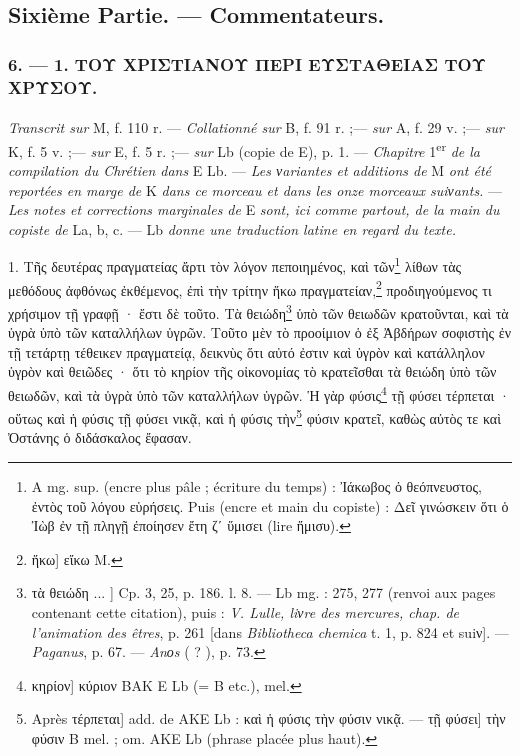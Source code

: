 \documentclass[a4paper, 11pt, oneside, polutonikogreek, french]{article}
\begin{document}
\bigskip
\centerline{\EightStarTaper}
\centerline{\EightStarTaper\EightStarTaper}
\bigskip
\clearpage
\subsection{Sixième Partie. --- Commentateurs.}
\subsubsection{6. --- 1. ΤΟΥ ΧΡΙΣΤΙΑΝΟΥ ΠΕΡΙ ΕΥΣΤΑΘΕΙΑΣ ΤΟΥ ΧΡΥΣΟΥ.}
\paragraph{}
\emph{Transcrit sur} M, f. 110 r. --- \emph{Collationné sur} B, f. 91 r. ;--- \emph{sur} A, f. 29 v. ;--- \emph{sur} K, f. 5 v. ;--- \emph{sur} E, f. 5 r. ;--- \emph{sur} Lb (copie de E), p. 1. --- \emph{Chapitre} 1\textsuperscript{er} \emph{de la compilation du Chrétien dans} E Lb. --- \emph{Les νariantes et additions de} M \emph{ont été reportées en marge de} K \emph{dans ce morceau et dans les onze morceaux suiνants.} --- \emph{Les notes et corrections marginales de} E \emph{sont, ici comme partout, de la main du copiste de} La, b, c. --- Lb \emph{donne une traduction latine en regard du texte.}

\bigskip

1. Τῆς δευτέρας πραγματείας ἄρτι τὸν λόγον πεποιημένος, καὶ τῶν\footnote{A mg. sup. (encre plus pâle ; écriture du temps) : Ἰάκωβος ὁ θεόπνευστος, ἐντὸς τοῦ λόγου εὑρήσεις. Puis (encre et main du copiste) : Δεῖ γινώσκειν ὅτι ὁ Ἰὼβ ἐν τῇ πληγῇ ἐποίησεν ἔτη ζʹ ὕμισει (lire ἥμισυ).} λίθων τὰς μεθόδους ἀφθόνως ἐκθέμενος, ἐπὶ τὴν τρίτην ἥκω πραγματείαν,\footnote{ἥκω] εἴκω M.} προδιηγούμενος τι χρήσιμον τῇ γραφῇ · ἔστι δὲ τοῦτο. Τὰ θειώδη\footnote{τὰ θειώδη ... ] Cp. 3, 25, p. 186. l. 8. --- Lb mg. : 275, 277 (renvoi aux pages contenant cette citation), puis : \emph{V. Lulle, liνre des mercures, chap. de l'animation des êtres}, p. 261 [dans \emph{Bibliotheca chemica} t. 1, p. 824 et suiν]. --- \emph{Paganus}, p. 67. --- \emph{Anοs} ( ? ), p. 73.} ὑπὸ τῶν θειωδῶν κρατοῦνται, καὶ τὰ ὑγρὰ ὑπὸ τῶν καταλλήλων ὑγρῶν. Τοῦτο μὲν τὸ προοίμιον ὁ ἐξ Ἀβδήρων σοφιστὴς ἐν τῇ τετάρτῃ τέθεικεν πραγματείᾳ, δεικνὺς ὅτι αὐτό ἐστιν καὶ ὑγρὸν καὶ κατάλληλον ὑγρὸν καὶ θειῶδες · ὅτι τὸ κηρίον τῆς οἰκονομίας τὸ κρατεῖσθαι τὰ θειώδη ὑπὸ τῶν θειωδῶν, καὶ τὰ ὑγρὰ ὑπὸ τῶν καταλλήλων ὑγρῶν. Ἡ γὰρ φύσις\footnote{κηρίον] κύριον BAK E Lb (= B etc.), mel.} τῇ φύσει τέρπεται · οὕτως καὶ ἡ φύσις τῇ φύσει νικᾷ, καὶ ἡ φύσις τὴν\footnote{Après τέρπεται] add. de AKE Lb : καὶ ἡ φύσις τὴν φύσιν νικᾷ. --- τῇ φύσει] τὴν φύσιν B mel. ; om. AKE Lb (phrase placée plus haut).} φύσιν κρατεῖ, καθὼς αὐτὸς τε καὶ Ὀστάνης ὁ διδάσκαλος ἔφασαν.
\end{document}
